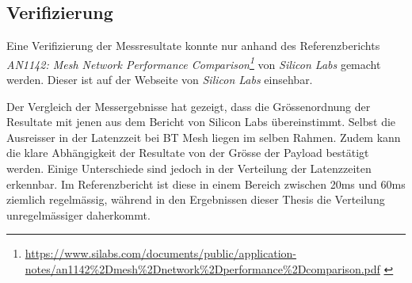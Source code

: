 \subsection{Verifizierung}\label{subsec:Verifizierung}
Eine Verifizierung der Messresultate konnte nur anhand des Referenzberichts \textit{AN1142: Mesh Network Performance
Comparison\footnote{\url{https://www.silabs.com/documents/public/application-notes/an1142\%2Dmesh\%2Dnetwork\%2Dperformance\%2Dcomparison.pdf} \cite{silicon_laboratories_inc_an1142_2020}}} von \textit{Silicon Labs} gemacht werden.
Dieser ist auf der Webseite von \textit{Silicon Labs} einsehbar.

Der Vergleich der Messergebnisse hat gezeigt, dass die Grössenordnung der Resultate mit jenen aus dem Bericht von Silicon Labs übereinstimmt.
Selbst die Ausreisser in der Latenzzeit bei BT Mesh liegen im selben Rahmen.
Zudem kann die klare Abhängigkeit der Resultate von der Grösse der Payload bestätigt werden.
Einige Unterschiede sind jedoch in der Verteilung der Latenzzeiten erkennbar.
Im Referenzbericht ist diese in einem Bereich zwischen 20ms und 60ms ziemlich regelmässig, während in den Ergebnissen dieser Thesis die Verteilung unregelmässiger daherkommt.






